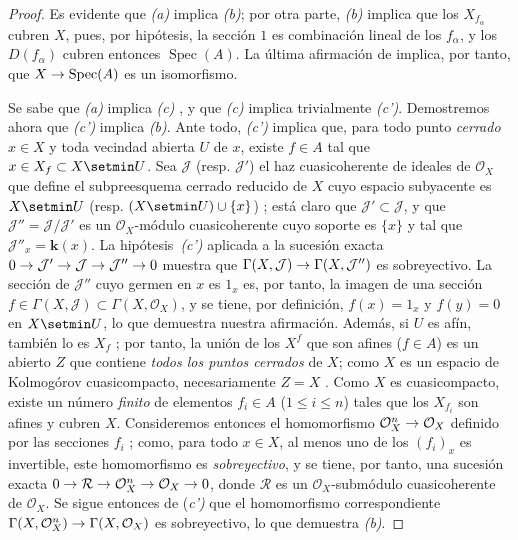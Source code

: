 \documentclass[oneside,10pt]{amsart}
\makeatletter
\renewcommand{\leq}{\leqslant}
\newcommand{\ega@arrow}[2]{\mathchoice{#1}{#2}{#2}{#2}}
\renewcommand{\to}{\ega@arrow{\longrightarrow}{\rightarrow}}
\newcommand{\oldpage}[2][]{\marginnote{\normalfont\footnotesize\textbf{#1}~|~#2}\ignorespaces}
\makeatother
\begin{document}
\begin{proof}
Es evidente que \emph{(a)} implica \emph{(b)};
por otra parte, \emph{(b)} implica que los $X_{f_\alpha}$ cubren $X$, pues, por hipótesis, la sección $1$ es combinación lineal de los $f_\alpha$, y los $D(f_\alpha)$ cubren entonces $\operatorname{Spec}(A)$.
La última afirmación de  implica, por tanto, que $X\to\operatorname{Spec}(A)$ es un isomorfismo.

Se sabe que \emph{(a)} implica \emph{(c)} , y que \emph{(c)} implica trivialmente \emph{(c')}.
Demostremos ahora que \emph{(c')} implica \emph{(b)}.
Ante todo, \emph{(c')} implica que, para todo punto \emph{cerrado} $x\in X$ y toda vecindad abierta $U$ de $x$, existe $f\in A$ tal que $x\in X_f\subset X\setmin U$.
Sea $\mathcal{J}$ (resp. $\mathcal{J}'$) el haz cuasicoherente de ideales de $\mathcal{O}_X$ que define el subpreesquema cerrado reducido de $X$ cuyo espacio subyacente es $X\setmin U$ (resp. $(X\setmin U)\cup\{x\}$) ;
está claro que $\mathcal{J}'\subset\mathcal{J}$, y que $\mathcal{J}''=\mathcal{J}/\mathcal{J}'$ es un $\mathcal{O}_X$-módulo cuasicoherente cuyo soporte es $\{x\}$ y tal que $\mathcal{J}''_x=\boldsymbol{k}(x)$.
La hipótesis~\emph{(c')} aplicada a la sucesión exacta $0\to\mathcal{J}'\to\mathcal{J}\to\mathcal{J}''\to0$ muestra que $\Gamma(X,\mathcal{J})\to\Gamma(X,\mathcal{J}'')$ es sobreyectivo.
La sección de $\mathcal{J}''$ cuyo germen en $x$ es $1_x$ es, por tanto, la imagen de una sección $f\in\Gamma(X,\mathcal{J})\subset\Gamma(X,\mathcal{O}_X)$, y se tiene, por definición, $f(x)=1_x$ y $f(y)=0$ en $X\setmin U$, lo que demuestra nuestra afirmación.
Además, si $U$ es afín, también lo es $X_f$ ; por tanto, la unión de los $X^f$ que son afines ($f\in A$) es un abierto $Z$ que contiene \emph{todos los puntos cerrados} de $X$;
como $X$ es un espacio de Kolmogórov cuasicompacto, necesariamente $Z=X$ .
Como $X$ es cuasicompacto, existe un número \emph{finito} de elementos $f_i\in A$ ($1\leq i\leq n$) tales que los $X_{f_i}$ son afines y cubren $X$.
Consideremos entonces el homomorfismo $\mathcal{O}_X^n\to\mathcal{O}_X$ definido por las secciones $f_i$ ;
como, para todo $x\in X$, al menos uno de los $(f_i)_x$ es invertible, este homomorfismo es \emph{sobreyectivo}, y se tiene, por tanto, una sucesión exacta $0\to\mathcal{R}\to\mathcal{O}_X^n\to\mathcal{O}_X\to0$, donde $\mathcal{R}$ es un $\mathcal{O}_X$-submódulo cuasicoherente de $\mathcal{O}_X$.
Se sigue entonces
\oldpage[II]{98}
de (\emph{c')} que el homomorfismo correspondiente $\Gamma(X,\mathcal{O}_X^n)\to\Gamma(X,\mathcal{O}_X)$ es sobreyectivo, lo que demuestra \emph{(b)}.


\end{proof}
\end{document}
